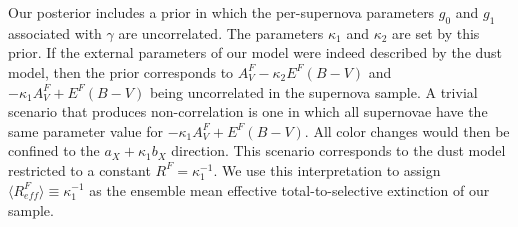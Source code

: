 \documentclass[trackchanges]{aastex61}   	%
\begin{document}
Our posterior
includes a prior in which the per-supernova parameters $g_0$ and  $g_1$ associated with $\gamma$ are uncorrelated.
The parameters $\kappa_1$ and $\kappa_2$ are set by this prior.
If the external parameters of our model were indeed described by the   dust model, then the prior corresponds
to    $A^F_V - \kappa_2 E^F(B-V)$ and $-\kappa_1 A^F_V + E^F(B-V)$ being uncorrelated in the supernova sample.
A trivial scenario that produces non-correlation is one in which all supernovae have the same parameter value for $-\kappa_1 A^F_V + E^F(B-V)$.
All color changes would then be confined to the $a_X+\kappa_1 b_X$ direction. This scenario corresponds to the   dust model restricted to a constant $R^F=\kappa_1^{-1}$.   We use this interpretation to assign  $\langle R^F_{\mathit{eff}}\rangle \equiv \kappa_1^{-1}$ as
the
ensemble mean
effective total-to-selective extinction of our sample.
\end{document}
